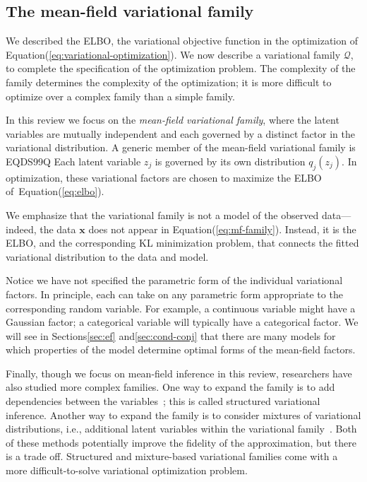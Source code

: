 \documentclass{article}
\begin{document}
\subsection{The mean-field variational family}
\label{sec:mff}

We described the \gls{ELBO}, the variational objective function in the
optimization of Equation\nobreakspace \textup {(\ref {eq:variational-optimization})}. We now describe a
variational family ${\mathcal{Q}}$, to complete the specification of the
optimization problem.  The complexity of the family determines the
complexity of the optimization; it is more difficult to optimize over
a complex family than a simple family.

In this review we focus on the \emph{mean-field variational family},
where the latent variables are mutually independent and each governed
by a distinct factor in the variational distribution.  A generic member
of the mean-field variational family is
EQDS99Q
Each latent variable $z_j$ is governed by its own distribution
$q_j(z_j)$.  In optimization, these variational factors are chosen to
maximize the \gls{ELBO} of~Equation\nobreakspace \textup {(\ref {eq:elbo})}.

We emphasize that the variational family is not a model of the
observed data---indeed, the data ${\mathbf{x}}$ does not appear in
Equation\nobreakspace \textup {(\ref {eq:mf-family})}. Instead, it is the \gls{ELBO}, and the
corresponding \gls{KL} minimization problem, that connects the fitted
variational distribution to the data and model.

Notice we have not specified the parametric form of the individual
variational factors. In principle, each can take on any parametric
form appropriate to the corresponding random variable. For example, a
continuous variable might have a Gaussian factor; a categorical
variable will typically have a categorical factor. We will see in
Sections\nobreakspace \ref {sec:ef} and\nobreakspace  \ref {sec:cond-conj} that there are many models for which
properties of the model determine optimal forms of the mean-field
factors.

Finally, though we focus on mean-field inference in this review,
researchers have also studied more complex families.  One way to
expand the family is to add dependencies between the
variables~\citep{Saul:1996a,Barber:1999a}; this is called structured
variational inference.  Another way to expand the family is to
consider mixtures of variational distributions, i.e., additional
latent variables within the variational family~\citep{Lawrence:1998}.
Both of these methods potentially improve the fidelity of the
approximation, but there is a trade off. Structured and mixture-based
variational families come with a more difficult-to-solve variational
optimization problem.
\end{document}
